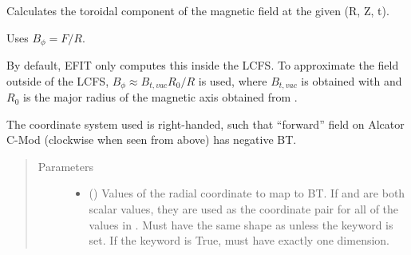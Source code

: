 \documentclass[letterpaper,10pt,english]{sphinxmanual}
\begin{document}
\begin{fulllineitems}
\begin{fulllineitems}
\begin{sphinxVerbatim}[commandchars=\\\{\}]
     
\end{sphinxVerbatim}

\end{fulllineitems}


\begin{fulllineitems}
\label{\detokenize{eqtools:eqtools.core.Equilibrium.rz2BT}}
Calculates the toroidal component of the magnetic field at the given (R, Z, t).

Uses \(B_\phi = F / R\).

By default, EFIT only computes this inside the LCFS. To approximate the
field outside of the LCFS, \(B_\phi \approx B_{t, vac} R_0 / R\) is
used, where \(B_{t, vac}\) is obtained with {\hyperref[\detokenize{eqtools:eqtools.core.Equilibrium.getBtVac}]{}} and
\(R_0\) is the major radius of the magnetic axis obtained from
{\hyperref[\detokenize{eqtools:eqtools.core.Equilibrium.getMagR}]{}}.

The coordinate system used is right-handed, such that “forward” field on
Alcator C-Mod (clockwise when seen from above) has negative BT.
\begin{quote}\begin{description}
\item[{Parameters}] \leavevmode\begin{itemize}
\item {} 
 () \textendash{} Values of the radial coordinate to
map to BT. If  and  are both scalar values,
they are used as the coordinate pair for all of the values in
. Must have the same shape as  unless the 
keyword is set. If the  keyword is True,  must
have exactly one dimension.


\end{itemize}
\end{description}
\end{quote}
\end{fulllineitems}
\end{fulllineitems}
\end{document}
